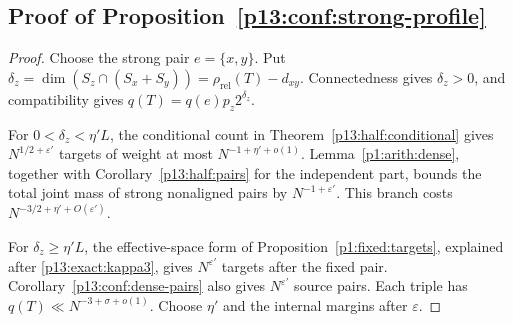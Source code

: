 \subsection{Proof of Proposition~\ref{p13:conf:strong-profile}}
\label{p14:comp:confinement:strong}

\begin{proof}
Choose the strong pair \(e=\{x,y\}\). Put
\(\delta_z=\dim(S_z\cap(S_x+S_y))
 =\rho_{\mathrm{rel}}(T)-d_{xy}\).
Connectedness gives \(\delta_z>0\), and compatibility gives
\(q(T)=q(e)p_z2^{\delta_z}\).

For \(0<\delta_z<\eta'L\), the conditional count
in Theorem~\ref{p13:half:conditional} gives
\(N^{1/2+\varepsilon'}\) targets of weight at most
\(N^{-1+\eta'+o(1)}\).
Lemma~\ref{p1:arith:dense}, together with
Corollary~\ref{p13:half:pairs} for the independent
part, bounds the total joint mass of strong nonaligned
pairs by \(N^{-1+\varepsilon'}\).
This branch costs \(N^{-3/2+\eta'+O(\varepsilon')}\).

For \(\delta_z\ge\eta'L\), the effective-space form of
Proposition~\ref{p1:fixed:targets}, explained after
\eqref{p13:exact:kappa3}, gives \(N^{\varepsilon'}\)
targets after the fixed pair.
Corollary~\ref{p13:conf:dense-pairs} also gives
\(N^{\varepsilon'}\) source pairs.
Each triple has \(q(T)\ll N^{-3+\sigma+o(1)}\).
Choose \(\eta'\) and the internal margins after
\(\varepsilon\).
\end{proof}
